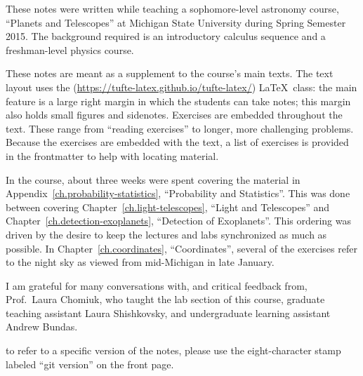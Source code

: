
These notes were written while teaching a sophomore-level astronomy course, ``Planets and Telescopes'' at Michigan State University during Spring Semester 2015. The background required is an introductory calculus sequence and a freshman-level physics course.

These notes are meant as a supplement to the course's main texts\cite{Lissauer2013Fundamental-Pla,Bennett2013The-Cosmic-Pers}.  The text layout uses the  (\url{https://tufte-latex.github.io/tufte-latex/}) \LaTeX\ class:  the main feature is a large right margin in which the students can take notes; this margin also holds small figures and sidenotes. Exercises are embedded throughout the text.  These range from ``reading exercises'' to longer, more challenging problems.  Because the exercises are embedded with the text, a list of exercises is provided in the frontmatter to help with locating material.

In the course, about three weeks were spent covering the material in Appendix~\ref{ch.probability-statistics}, ``Probability and Statistics''.  This was done between covering Chapter~\ref{ch.light-telescopes}, ``Light and Telescopes'' and Chapter~\ref{ch.detection-exoplanets}, ``Detection of Exoplanets''.  This ordering was driven by the desire to keep the lectures and labs synchronized as much as possible. In Chapter~\ref{ch.coordinates}, ``Coordinates'', several of the exercises refer to the night sky as viewed from mid-Michigan in late January.

I am grateful for many conversations with, and critical feedback from,  Prof.~Laura Chomiuk, who taught the lab section of this course, graduate teaching assistant Laura Shishkovsky, and undergraduate learning assistant Andrew Bundas. 

 to refer to a specific version of the notes, please use the eight-character stamp labeled ``git version'' on the front page.
